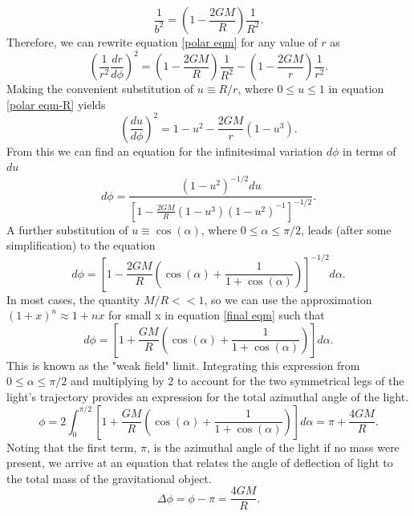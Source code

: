 \documentclass[a4paper,12pt]{article}
\begin{document}
\begin{equation} 
\frac{1}{b^2} = \left(1-\frac{2GM}{R}\right)\frac{1}{R^2}.
\end{equation} 
Therefore, we can rewrite equation \ref{polar eqm} for any value of $r$ as
\begin{equation} \label{polar eqm-R}
\left(\frac{1}{r^2} \frac{dr}{d \phi}\right)^2 = \left(1-\frac{2GM}{R}\right)\frac{1}{R^2} - \left(1-\frac{2GM}{r}\right)\frac{1}{r^2}.
\end{equation}
Making the convenient substitution of $u \equiv R/r$, where $0 \leq u \leq 1$ in equation \ref{polar eqm-R} yields 
\begin{equation} \label{polar eqm-u}
\left(\frac{du}{d\phi} \right)^2 = 1- u^2 - \frac{2GM}{r}(1-u^3).
\end{equation}
From this we can find an equation for the infinitesimal variation $d\phi$ in terms of $du$
\begin{equation} \label{dphi eqm}
d\phi = \frac{(1-u^2)^{-1/2}du}{\left[1 - \frac{2GM}{R}(1-u^3)(1-u^2)^{-1}\right]^{-1/2}}.
\end{equation}
A further substitution of $u \equiv \cos(\alpha)$, where $0 \leq \alpha \leq \pi/2$, leads (after some simplification) to the equation
\begin{equation} \label{final eqm}
d\phi = \left[1-\frac{2GM}{R}\left(\cos(\alpha) + \frac{1}{1+\cos(\alpha)}\right)\right]^{-1/2} d\alpha.
\end{equation}
\newpage
In most cases, the quantity $M/R<<1$, so we can use the approximation $(1+x)^n \approx 1+nx$ for small x in equation \ref{final eqm} such that
\begin{equation}
d\phi = \left[1 + \frac{GM}{R} \left(\cos(\alpha) + \frac{1}{1+\cos(\alpha)}\right)\right]d\alpha.
\end{equation}
This is known as the "weak field" limit.  Integrating this expression from $0 \leq \alpha \leq \pi/2$ and multiplying by 2 to account for the two symmetrical legs of the light's trajectory provides an expression for the total azimuthal angle of the light.
\begin{equation} \label{polar angle}
\phi = 2 \int_{0}^{\pi/2} \left[1 + \frac{GM}{R} \left(\cos(\alpha) + \frac{1}{1+\cos(\alpha)}\right)\right] d\alpha = \pi + \frac{4GM}{R}.
\end{equation}
Noting that the first term, $\pi$, is the azimuthal angle of the light if no mass were present, we arrive at an equation that relates the angle of deflection of light to the total mass of the gravitational object. 
\begin{equation} \label{final GR}
\Delta \phi = \phi - \pi = \frac{4GM}{R} .
\end{equation}
\end{document}
